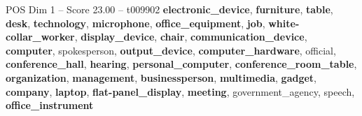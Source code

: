 \begin{textsample}{POS Dim 1 – Score 23.00 – t009902}  \label{ex:f1_pos_036}
\textbf{electronic\_device}, \textbf{furniture}, \textbf{table}, \textbf{desk}, \textbf{technology}, \textbf{microphone}, \textbf{office\_equipment}, \textbf{job}, \textbf{white-collar\_worker}, \textbf{display\_device}, \textbf{chair}, \textbf{communication\_device}, \textbf{computer}, spokesperson, \textbf{output\_device}, \textbf{computer\_hardware}, official, \textbf{conference\_hall}, \textbf{hearing}, \textbf{personal\_computer}, \textbf{conference\_room\_table}, \textbf{organization}, \textbf{management}, \textbf{businessperson}, \textbf{multimedia}, \textbf{gadget}, \textbf{company}, \textbf{laptop}, \textbf{flat-panel\_display}, \textbf{meeting}, government\_agency, speech, \textbf{office\_instrument}

\end{textsample}
